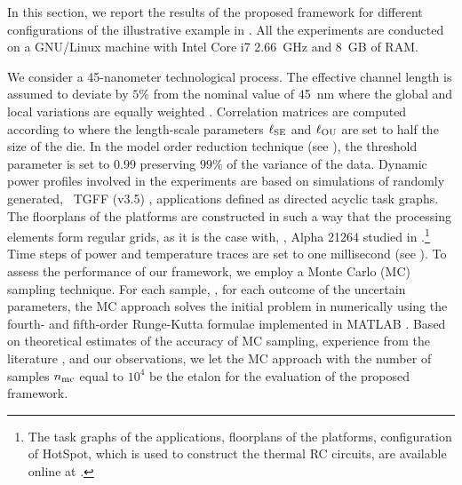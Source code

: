 In this section, we report the results of the proposed framework for different configurations of the illustrative example in .
All the experiments are conducted on a GNU/Linux machine with Intel Core i7 2.66~GHz and 8~GB of RAM.

We consider a 45-nanometer technological process.
The effective channel length is assumed to deviate by $5\%$ from the nominal value of 45~nm where the global and local variations are equally weighted \cite{juan2011, juan2012}.
Correlation matrices are computed according to  where the length-scale parameters $\ell_{\text{SE}}$ and $\ell_{\text{OU}}$ are set to half the size of the die.
In the model order reduction technique (see ), the threshold parameter is set to $0.99$ preserving $99\%$ of the variance of the data.
Dynamic power profiles involved in the experiments are based on simulations of randomly generated, \via\ TGFF (v3.5) \cite{dick1998}, applications defined as directed acyclic task graphs.
The floorplans of the platforms are constructed in such a way that the processing elements form regular grids, as it is the case with, \eg, Alpha 21264 studied in \cite{juan2011}.\footnote{The task graphs of the applications, floorplans of the platforms, configuration of HotSpot, which is used to construct the thermal RC circuits, are available online at \cite{sources}.}
Time steps of power and temperature traces are set to one millisecond (see ).
To assess the performance of our framework, we employ a Monte Carlo (MC) sampling technique.
For each sample, \ie, for each outcome of the uncertain parameters, the MC approach solves the initial problem in  numerically using the fourth- and fifth-order Runge-Kutta formulae \cite{press2007} implemented in MATLAB \cite{matlab}.
Based on theoretical estimates \cite{diaz-emparanza2002} of the accuracy of MC sampling, experience from the literature \cite{xiu2010, maitre2010, shen2009, eldred2008}, and our observations, we let the MC approach with the number of samples ${n_\text{mc}}$ equal to $10^4$ be the etalon for the evaluation of the proposed framework.


